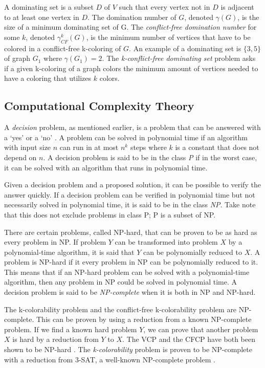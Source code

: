 \documentclass{sig-alternate}
\begin{document}
A dominating set is a subset $D$ of $V$ such that every vertex not in $D$ is adjacent to at least one vertex in $D$. The domination number of $G$, denoted $\gamma(G)$, is the size of a minimum dominating set of G. The \emph{conflict-free domination number} for some $k$, denoted $\gamma_{CF}^k(G)$, is the minimum number of vertices that have to be colored in a conflict-free k-coloring of $G$. An example of a dominating set is $\{3, 5\}$ of graph $G_1$ where $\gamma(G_1) = 2$. The \emph{k-conflict-free dominating set} problem asks if a given k-coloring of a graph colors the minimum amount of vertices needed to have a coloring that utilizes $k$ colors.

\subsection{Computational Complexity Theory}
\label{sec:complexitytheory}
A \emph{decision} problem, as mentioned earlier, is a problem that can be answered with a `yes' or a `no' \cite{sipser2006introduction}. A problem can be solved in polynomial time if an algorithm with input size $n$ can run in at most $n^k$ steps where $k$ is a constant that does not depend on $n$. A decision problem is said to be in the class \emph{P} if in the worst case, it can be solved with an algorithm that runs in polynomial time.

Given a decision problem and a proposed solution, it can be possible to verify the answer quickly. If a decision problem can be verified in polynomial time but not necessarily solved in polynomial time, it is said to be in the class \emph{NP}. Take note that this does not exclude problems in class P; P is a subset of NP.

There are certain problems, called NP-hard, that can be proven to be as hard as every problem in NP. If problem $Y$ can be transformed into problem $X$ by a polynomial-time algorithm, it is said that $Y$ can be polynomially reduced to $X$. A problem is NP-hard if it every problem in NP can be polynomially reduced to it. This means that if an NP-hard problem can be solved with a polynomial-time algorithm, then any problem in NP could be solved in polynomial time. A decision problem is said to be \emph{NP-complete} when it is both in NP and NP-hard.

The k-colorability problem and the conflict-free k-colorability problem are NP-complete. This can be proven by using a reduction from a known NP-complete problem. If we find a known hard problem $Y$, we can prove that another problem $X$ is hard by a reduction from $Y$ to $X$. The VCP and the CFCP have both been shown to be NP-hard \cite{abel2017three,moret1998theory}. The \emph{k-colorability} problem is proven to be NP-complete with a reduction from 3-SAT, a well-known NP-complete problem \cite{sharma2012new}.
\end{document}
